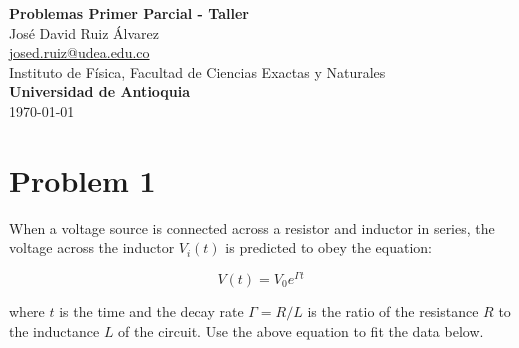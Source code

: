 \documentclass[10.5pt]{article}
\begin{document}
\noindent
\begin{minipage}[b]{0.75\linewidth}
{\LARGE\bf Problemas Primer Parcial - Taller}\\ %
\large{Jos\'{e} David Ruiz \'{A}lvarez} \\
\small{\href{mailto:josed.ruiz@udea.edu.co}{josed.ruiz@udea.edu.co}} \\ %
\normalsize{Instituto de Física, Facultad de Ciencias Exactas y Naturales} \\%
\normalsize{\bf Universidad de Antioquia} \\[8mm]
\today %
\end{minipage}%



\section{Problem 1}

When a voltage source is connected across a resistor and inductor in series, the voltage across the inductor $V_{i}(t)$ is predicted to obey the equation:

\begin{equation}
V(t)=V_{0}e^{\Gamma t}
\end{equation}

where $t$ is the time and the decay rate $\Gamma=R/L$ is the ratio of the resistance $R$ to the inductance $L$ of the circuit. Use the above equation to fit the data below.
\end{document}

